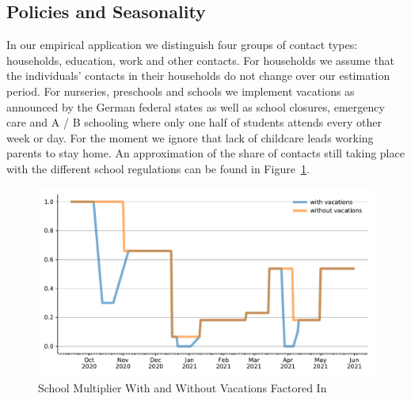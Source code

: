 \subsection{Policies and Seasonality}
\label{subsec:policies_seasonality}

\FloatBarrier

In our empirical application we distinguish four groups of contact types: households,
education, work and other contacts.
For households we assume that the individuals'
contacts in their households do not change over our estimation period.
For nurseries, preschools and schools we implement vacations as announced by the German
federal states as well as school closures, emergency care and A / B schooling where only
one half of students attends every other week or day. For the moment we ignore that lack
of childcare leads working parents to stay home. An approximation of the share of contacts still taking place with the different school regulations can be found in Figure~\ref{fig:school_multiplier}.

\begin{figure}
    \centering
    \includegraphics[width=\textwidth]{../figures/results/figures/data/school_multiplier_comparison}
    \caption{School Multiplier With and Without Vacations Factored In}
    \floatfoot{\noindent}
    \label{fig:school_multiplier}
\end{figure}


%
%
%
%

